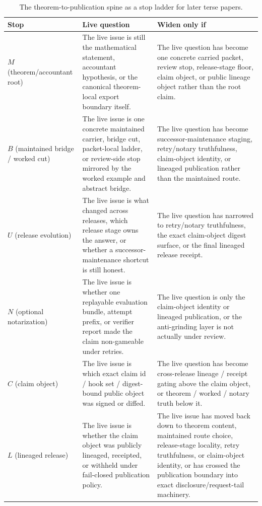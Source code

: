 \documentclass[11pt]{article}
\begin{document}
\begin{table}[t]
\centering
\small
\begin{tabularx}{\linewidth}{@{}lX X@{}}
\toprule
Stop & Live question & Widen only if \\
\midrule
$M$ (theorem/accountant root) & The live issue is still the mathematical statement, accountant hypothesis, or the canonical theorem-local export boundary itself. & The live question has become one concrete carried packet, review stop, release-stage floor, claim object, or public lineage object rather than the root claim. \\
$B$ (maintained bridge / worked cut) & The live issue is one concrete maintained carrier, bridge cut, packet-local ladder, or review-side stop mirrored by the worked example and abstract bridge. & The live question has become successor-maintenance staging, retry/notary truthfulness, claim-object identity, or lineaged publication rather than the maintained route. \\
$U$ (release evolution) & The live issue is what changed across releases, which release stage owns the answer, or whether a successor-maintenance shortcut is still honest. & The live question has narrowed to retry/notary truthfulness, the exact claim-object digest surface, or the final lineaged release receipt. \\
$N$ (optional notarization) & The live issue is whether one replayable evaluation bundle, attempt prefix, or verifier report made the claim non-gameable under retries. & The live question is only the claim-object identity or lineaged publication, or the anti-grinding layer is not actually under review. \\
$C$ (claim object) & The live issue is which exact claim id / hook set / digest-bound public object was signed or diffed. & The live question has become cross-release lineage / receipt gating above the claim object, or theorem / worked / notary truth below it. \\
$L$ (lineaged release) & The live issue is whether the claim object was publicly lineaged, receipted, or withheld under fail-closed publication policy. & The live issue has moved back down to theorem content, maintained route choice, release-stage locality, retry truthfulness, or claim-object identity, or has crossed the publication boundary into exact disclosure/request-tail machinery. \\
\bottomrule
\end{tabularx}
\caption{The theorem-to-publication spine as a stop ladder for later terse papers.}
\label{tab:publication-stop-ladder}
\end{table}
\end{document}
